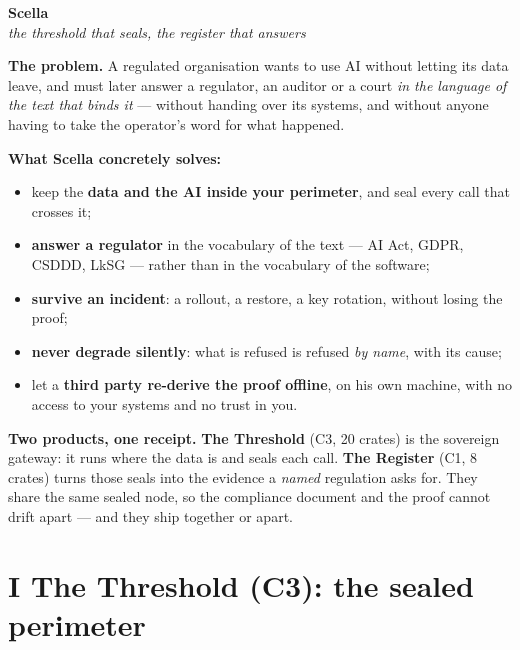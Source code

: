 \documentclass[11pt]{article}
\begin{document}
\begin{center}
{\Huge\bfseries\color{efenavy} Scella}\\[3pt]
{\large\color{efegray}\itshape the threshold that seals, the register that answers}
\end{center}
\vspace{6pt}

\begin{these}
\textbf{The problem.} A regulated organisation wants to use AI without letting its data leave, and
must later answer a regulator, an auditor or a court \emph{in the language of the text that binds
it} --- without handing over its systems, and without anyone having to take the operator's word for
what happened.

\textbf{What Scella concretely solves:}
\begin{itemize}[leftmargin=1.3em,itemsep=1.5pt,topsep=2pt,parsep=0pt,label=\textendash]
\item keep the \textbf{data and the AI inside your perimeter}, and seal every call that crosses it;
\item \textbf{answer a regulator} in the vocabulary of the text --- AI Act, GDPR, CSDDD, LkSG ---
rather than in the vocabulary of the software;
\item \textbf{survive an incident}: a rollout, a restore, a key rotation, without losing the proof;
\item \textbf{never degrade silently}: what is refused is refused \emph{by name}, with its cause;
\item let a \textbf{third party re-derive the proof offline}, on his own machine, with no access to
your systems and no trust in you.
\end{itemize}
\vspace{2pt}
\textbf{Two products, one receipt.} \textbf{The Threshold} (C3, 20 crates) is the sovereign gateway:
it runs where the data is and seals each call. \textbf{The Register} (C1, 8 crates) turns those seals
into the evidence a \emph{named} regulation asks for. They share the same sealed node, so the
compliance document and the proof cannot drift apart --- and they ship together or apart.
\end{these}

\section{I \;\textbar\; The Threshold (C3): the sealed perimeter}
\end{document}
